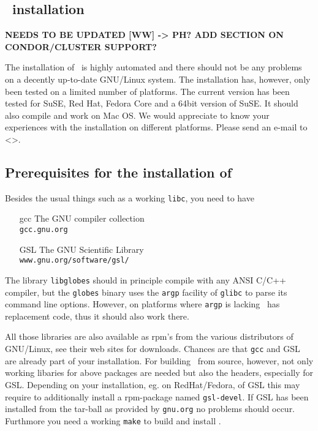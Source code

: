 
\begin{appendix}

\chapter{\GLOBES\ installation}
\label{app:installation}

{\bf NEEDS TO BE UPDATED [WW] -> PH? ADD SECTION ON CONDOR/CLUSTER SUPPORT?}

The installation of \GLOBES\ is highly automated and there should not be
any problems on a decently up-to-date GNU/Linux system. The installation
has, however, only been tested on a limited number of platforms. The 
current version has been tested for SuSE, Red Hat, Fedora Core and
a 64bit version of SuSE. It should also compile and work on Mac OS. We 
would appreciate to know your experiences with the installation on different platforms.
Please send an e-mail to <\bugs>.

\section*{Prerequisites for the installation of \GLOBES}

Besides the usual things such as a working \verb`libc`, you need to have
\begin{itemize}
\item[gcc] The GNU compiler collection\\
\verb+gcc.gnu.org+
\item[GSL] The GNU Scientific Library\\
\verb+www.gnu.org/software/gsl/+
\end{itemize}
The library \verb+libglobes+ should in principle compile with any
ANSI C/C++ compiler, but the \verb+globes+ binary uses the 
\verb+argp+ facility of \verb+glibc+ to parse its command line options.
However, on platforms where \verb+argp+ is lacking \GLOBES\ has replacement code, 
thus it should also work there.

All those libraries are also available as rpm's from the various
distributors of GNU/Linux, see their web sites for downloads. Chances are 
that \verb+gcc+ and GSL are already part of your installation.  For building \GLOBES\ 
from source, however, not only working libaries for above packages are 
needed but also the headers,  especially for GSL. Depending on your
installation, eg. on RedHat/Fedora, of GSL this may require to additionally 
install a rpm-package named \verb+gsl-devel+. If GSL has been installed from the 
tar-ball as provided by \verb`gnu.org` no problems should occur. Furthmore you need 
a working \verb+make+ to build and install \GLOBES.


\end{appendix}

